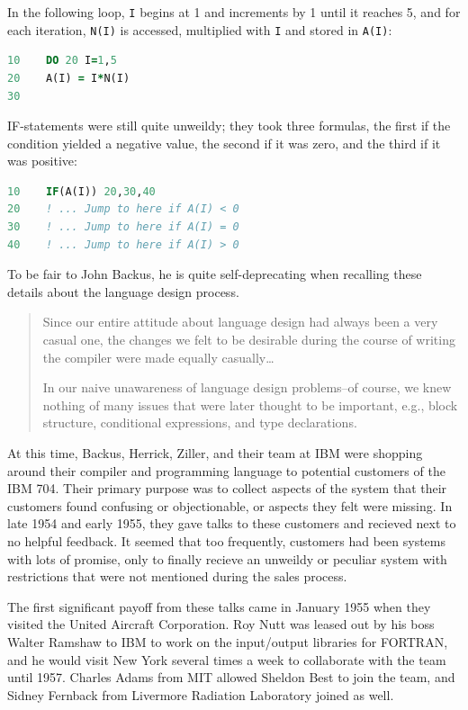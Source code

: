 In the following loop, \texttt{I} begins at 1 and increments by 1 until it reaches 5, and for
each iteration, \texttt{N(I)} is accessed, multiplied with \texttt{I} and stored in \texttt{A(I)}:

\begin{lstlisting}[language=Fortran,frame=single]
10    DO 20 I=1,5
20    A(I) = I*N(I)
30
\end{lstlisting}

IF-statements were still quite unweildy; they took three formulas, the first if the
condition yielded a negative value, the second if it was zero, and the third if it was positive:

\begin{lstlisting}[language=Fortran,frame=single]
10    IF(A(I)) 20,30,40
20    ! ... Jump to here if A(I) < 0
30    ! ... Jump to here if A(I) = 0
40    ! ... Jump to here if A(I) > 0
\end{lstlisting}

To be fair to John Backus, he is quite self-deprecating when recalling these details about the
language design process.

\begin{quotation}
	Since our entire attitude about language design had always been a
	very casual one, the changes we felt to be desirable during the course
	of writing the compiler were made equally casually\dots

	In our naive unawareness of language design problems--of course,
	we knew nothing of many issues that were later thought to be important,
	e.g., block structure, conditional expressions, and type declarations.
\end{quotation}

At this time, Backus, Herrick, Ziller, and their team at IBM were shopping around
their compiler and programming language to potential customers of the IBM 704.
Their primary purpose was to collect aspects of the system that their customers found
confusing or objectionable, or aspects they felt were missing.
In late 1954 and early 1955, they gave talks to these customers and recieved next to
no helpful feedback.
It seemed that too frequently, customers had been systems with lots of promise, only to
finally recieve an unweildy or peculiar system with restrictions that were not mentioned
during the sales process.

The first significant payoff from these talks came in January 1955 when they visited the
United Aircraft Corporation. Roy Nutt was leased out by his boss Walter Ramshaw
to IBM to work on the input/output
libraries for FORTRAN, and he would visit New York several times a week to collaborate with
the team until 1957.
Charles Adams from MIT allowed Sheldon Best to join the team,
and Sidney Fernback from Livermore Radiation Laboratory joined as well.


